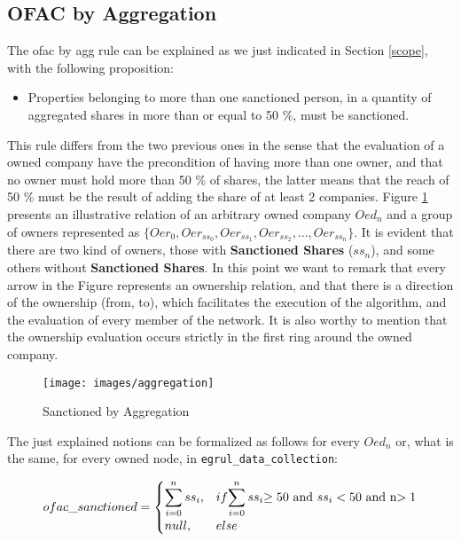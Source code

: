 \begin{spacing}{1.5}
	
	\subsection{OFAC by Aggregation}

	
	The \gls{ofac} by \gls{agg} rule can be explained as we just indicated in Section \ref{scope}, with the following proposition:
	
	\begin{itemize}
				\item Properties belonging to more than one sanctioned person, in a quantity of aggregated shares in more than or equal to 50 \%, must be sanctioned.
	\end{itemize}
	
	This rule differs from the two previous ones in the sense that the evaluation of a owned company have the precondition of having more than one owner, and that no owner must hold more than 50 \% of shares, the latter means that the reach of 50 \% must be the result of adding the share of at least 2 companies. Figure \ref{figure7} presents an illustrative relation of an arbitrary owned company $Oed_{n}$ and a group of owners represented as 	$\{Oer_{0}, Oer_{ss_{0}}, Oer_{ss_{1}}, Oer_{ss_{2}}, \dots, Oer_{ss_{n}}\}$. It is evident that there are two kind of owners, those with \textbf{Sanctioned Shares} ($ss_{n}$), and some others without \textbf{Sanctioned Shares}. 
	In this point we want to remark that every arrow in the Figure represents an ownership relation, and that there is a direction of the ownership (from, to), which facilitates the execution of the algorithm, and the evaluation of every member of the network. 	It is also worthy to mention that the ownership evaluation occurs strictly in the first ring around the owned company.  
	
	\begin{figure}
		\centering
	\texttt{[image: images/aggregation]}
		\caption{Sanctioned by Aggregation}\label{figure7}
	\end{figure}
	
	
	The just explained notions can be formalized as follows for every $Oed_{n}$ or, what is the same, for every owned node, in \texttt{egrul\_data\_collection}:
	
	\begin{equation} \label{eq2}
	ofac\_sanctioned =
		\begin{cases}
     	   \displaystyle\sum_{i=0}^{n} ss_{i}, & if  $$\displaystyle\sum_{i=0}^{n} ss_{i}$$ \geq 50 $ and  $ ss_{i} < 50 $ and  n$ > 1	 \\
     	   null, & else \\
		\end{cases}
	\end{equation}
	

\end{spacing}
